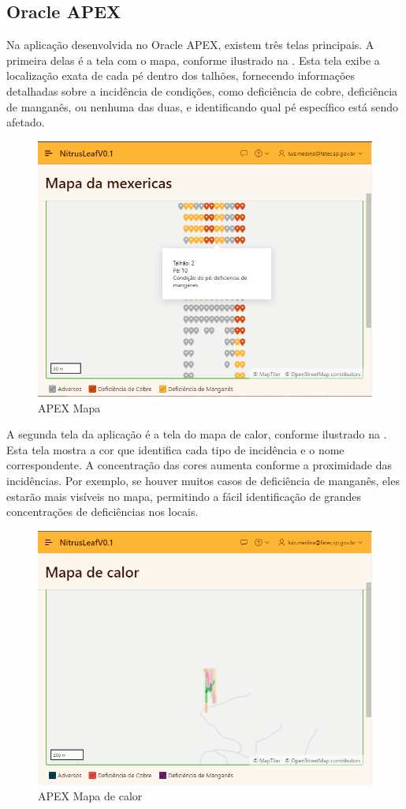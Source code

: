 \documentclass[
  a4paper,%
  12pt,%
  english,%
  brazilian,%
]{article}
\begin{document}
\subsection*{\textbf{Oracle APEX}}

Na aplicação desenvolvida no Oracle APEX, existem três telas principais. A primeira delas é a tela com o mapa, conforme ilustrado na . Esta tela exibe a localização exata de cada pé dentro dos talhões, fornecendo informações detalhadas sobre a incidência de condições, como deficiência de cobre, deficiência de manganês, ou nenhuma das duas, e identificando qual pé específico está sendo afetado.

\begin{figure}[H]
\centering
\caption{APEX Mapa}%
\label{fig:APEX-mapa}
\includegraphics[width=0.8\linewidth]{Logos/mapa.png}
\end{figure}

A segunda tela da aplicação é a tela do mapa de calor, conforme ilustrado na . Esta tela mostra a cor que identifica cada tipo de incidência e o nome correspondente. A concentração das cores aumenta conforme a proximidade das incidências. Por exemplo, se houver muitos casos de deficiência de manganês, eles estarão mais visíveis no mapa, permitindo a fácil identificação de grandes concentrações de deficiências nos locais.

\begin{figure}[H]
\centering
\caption{APEX Mapa de calor}%
\label{fig:APEX-mapa-de-calor}
\includegraphics[width=0.8\linewidth]{Logos/mapadecalor.png}
\end{figure}
\end{document}
